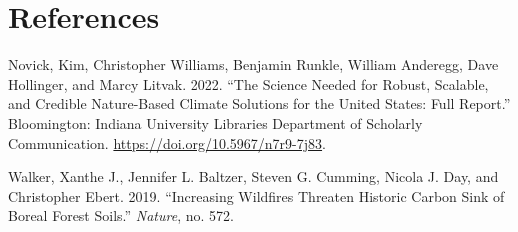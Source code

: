 \documentclass[
  letterpaper,
  DIV=11,
  numbers=noendperiod]{scrreprt}
\newlength{\cslhangindent}
\newlength{\cslentryspacingunit} %
\newenvironment{CSLReferences}[2] %
 {%
  \setlength{\parindent}{0pt}
  \ifodd #1
  \let\oldpar\par
  \def\par{\hangindent=\cslhangindent\oldpar}
  \fi
  \setlength{\parskip}{#2\cslentryspacingunit}
 }%
 {}
\begin{document}

\hypertarget{references}{%
\chapter*{References}\label{references}}


\hypertarget{refs}{}
\begin{CSLReferences}{1}{0}
\leavevmode{}%
Novick, Kim, Christopher Williams, Benjamin Runkle, William Anderegg,
Dave Hollinger, and Marcy Litvak. 2022. {``The Science Needed for
Robust, Scalable, and Credible Nature-Based Climate Solutions for the
United States: Full Report.''} Bloomington: Indiana University Libraries
Department of Scholarly Communication.
\url{https://doi.org/10.5967/n7r9-7j83}.

\leavevmode{}%
Walker, Xanthe J., Jennifer L. Baltzer, Steven G. Cumming, Nicola J.
Day, and Christopher Ebert. 2019. {``Increasing Wildfires Threaten
Historic Carbon Sink of Boreal Forest Soils.''} \emph{Nature}, no. 572.

\end{CSLReferences}
\end{document}
